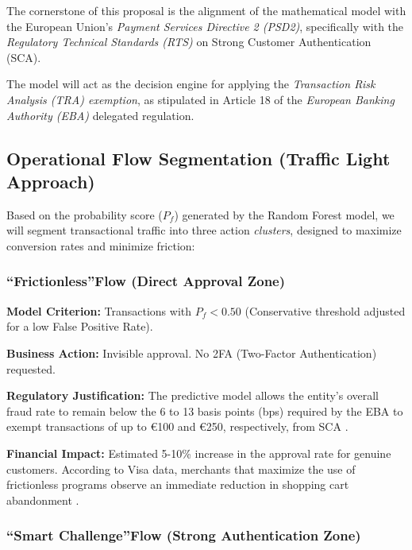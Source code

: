 \documentclass[12pt,a4paper]{report}
\begin{document}
The cornerstone of this proposal is the alignment of the mathematical model with the European Union's \textit{Payment Services Directive 2 (PSD2)}, specifically with the \textit{Regulatory Technical Standards (RTS)} on Strong Customer Authentication (SCA).

The model will act as the decision engine for applying the \textit{Transaction Risk Analysis (TRA) exemption}, as stipulated in Article 18 of the \textit{European Banking Authority (EBA)} delegated regulation.



\subsection{Operational Flow Segmentation (Traffic Light Approach)}

Based on the probability score (\(P_f\)) generated by the Random Forest model, we will segment transactional traffic into three action \textit{clusters}, designed to maximize conversion rates and minimize friction:

\subsubsection{\textquotedblleft Frictionless\textquotedblright Flow (Direct Approval Zone)}

\textbf{Model Criterion:} Transactions with \(P_f < 0.50\) (Conservative threshold adjusted for a low False Positive Rate).  

\textbf{Business Action:} Invisible approval. No 2FA (Two-Factor Authentication) requested.  

\textbf{Regulatory Justification:} The predictive model allows the entity’s overall fraud rate to remain below the 6 to 13 basis points (bps) required by the EBA to exempt transactions of up to €100 and €250, respectively, from SCA \cite{eba2023}.
 

\textbf{Financial Impact:} Estimated 5-10\% increase in the approval rate for genuine customers. According to Visa data, merchants that maximize the use of frictionless programs observe an immediate reduction in shopping cart abandonment \cite{visa2023a}.

\subsubsection{\textquotedblleft Smart Challenge\textquotedblright Flow (Strong Authentication Zone)}
\end{document}
